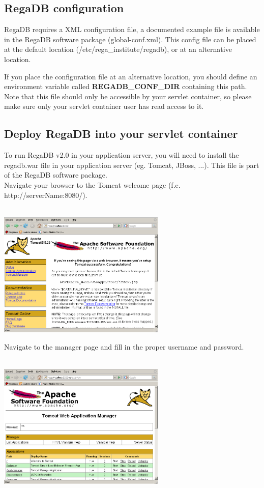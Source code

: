 \subsection{RegaDB configuration}
RegaDB requires a XML configuration file, a documented example file is available in the RegaDB software package (global-conf.xml). This config file can be placed at the default location (/etc/rega\_institute/regadb), or at an alternative location.

If you place the configuration file at an alternative location, you should define an environment variable called \textbf{REGADB\_CONF\_DIR} containing this path.
Note that this file should only be accessible by your servlet container, so please make sure only your servlet container user has read access to it.

\subsection{Deploy RegaDB into your servlet container}
To run RegaDB v2.0 in your application server, you will need to install the regadb.war file in your application server (eg. Tomcat, JBoss, ...). This file is part of the RegaDB software package.
\\
Navigate your browser to the Tomcat welcome page (f.e. http://serverName:8080/).
\\
\vspace{0.5cm}~ \\ \centerline{\includegraphics[width=8cm] {pics/nsis/tomcat_page.png}}
Navigate to the manager page and fill in the proper username and password.
\\
\vspace{0.5cm}~ \\ \centerline{\includegraphics[width=8cm] {pics/nsis/tomcat_page_manager_1.png}}
